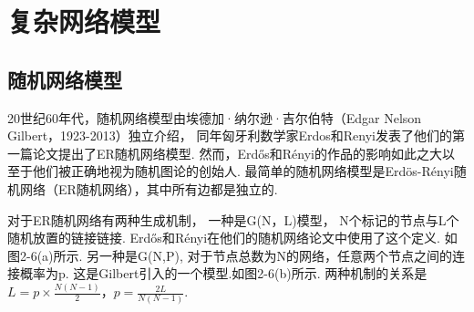 \documentclass[bachelor,adobefonts]{jnuthesis}
\begin{document}
\section{复杂网络模型}
\subsection{随机网络模型}
20世纪60年代，随机网络模型由埃德加·纳尔逊·吉尔伯特（Edgar Nelson Gilbert，1923-2013）\cite{Gilbert1959Random}独立介绍，
同年匈牙利数学家Erdos和Renyi发表了他们的第一篇论文提出了ER随机网络模型\cite{Erdos1959On}.
然而，Erdős和Rényi的作品的影响如此之大以至于他们被正确地视为随机图论的创始人.
最简单的随机网络模型是Erdös-Rényi随机网络（ER随机网络），其中所有边都是独立的.

对于ER随机网络有两种生成机制，
一种是G(N，L)模型， N个标记的节点与L个随机放置的链接链接.
Erdős和Rényi在他们的随机网络论文中使用了这个定义\cite{Erdos1959On, Erd2012On}.
如图2-6(a)所示.
另一种是G(N,P), 对于节点总数为N的网络，任意两个节点之间的连接概率为p.
这是Gilbert引入的一个模型\cite{Gilbert1959Random}.如图2-6(b)所示.
两种机制的关系是$L=p \times \frac{N(N-1)}{2}$，$p=\frac{2L}{N(N-1)}$.



\end{document}
